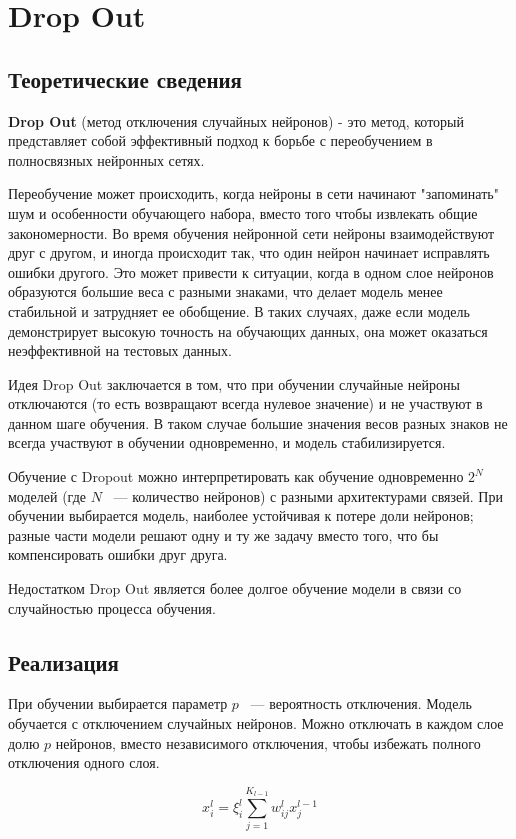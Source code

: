 \section{Drop Out}
\subsection{Теоретические сведения}

\textbf{Drop Out} (метод отключения случайных нейронов) - это метод, который представляет собой эффективный подход к борьбе с переобучением в полносвязных нейронных сетях. 

Переобучение может происходить, когда нейроны в сети начинают "запоминать" шум и особенности обучающего набора, вместо того чтобы извлекать общие закономерности. Во время обучения нейронной сети нейроны взаимодействуют друг с другом, и иногда происходит так, что один нейрон начинает исправлять ошибки другого. Это может привести к ситуации, когда в одном слое нейронов образуются большие веса с разными знаками, что делает модель менее стабильной и затрудняет ее обобщение. В таких случаях, даже если модель демонстрирует высокую точность на обучающих данных, она может оказаться неэффективной на тестовых данных.

Идея Drop Out заключается в том, что при обучении случайные нейроны отключаются (то есть возвращают всегда нулевое значение) и не участвуют в данном шаге обучения. В таком случае большие значения весов разных знаков не всегда участвуют в обучении одновременно, и модель стабилизируется.

Обучение с Dropout можно интерпретировать как обучение одновременно $2^N$ моделей (где $N$ ~--- количество нейронов) с разными архитектурами связей. При обучении выбирается модель, наиболее устойчивая к потере доли нейронов; разные части модели решают одну и ту же задачу вместо того, что бы компенсировать ошибки друг друга.

Недостатком Drop Out является более долгое обучение модели в связи со случайностью процесса обучения.

\subsection{Реализация}
При обучении выбирается параметр $p$ ~--- вероятность отключения. Модель обучается с отключением случайных нейронов. Можно отключать в каждом слое долю $p$ нейронов, вместо независимого отключения, чтобы избежать полного отключения одного слоя.

$$x_i^l = \xi_i^l \sum_{j=1}^{K_{l-1}} w_{ij}^l x_j^{l-1} $$

